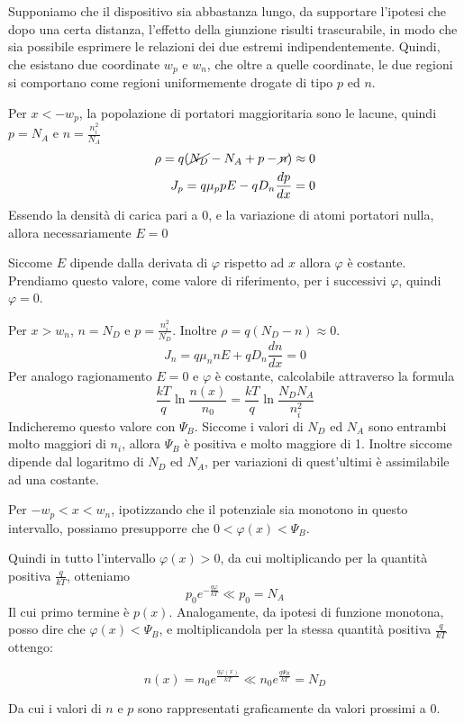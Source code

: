 \documentclass[../template]{subfiles}
\begin{document}
Supponiamo che il dispositivo sia abbastanza lungo, da supportare l'ipotesi che dopo una certa distanza, l'effetto della giunzione risulti trascurabile, in modo che sia possibile esprimere le relazioni dei due estremi indipendentemente.
Quindi, che esistano due coordinate $w_p$ e $w_n$, che oltre a quelle coordinate, le due regioni si comportano come regioni uniformemente drogate di tipo $p$ ed $n$.


\begin{tcolorbox}[title={Zona neutra p}]
    Per $x < -w_p$, la popolazione di portatori maggioritaria sono le lacune, quindi $p = N_A$ e $n = \frac{n_i^2}{N_A}$
    \begin{align*}
        \rho = q (\cancel{N_D} - N_A + p - \cancel{n}) \approx  0\\
        J_p = q \mu_p p E - q D_n \frac{dp}{dx} = 0
    \end{align*}
    Essendo la densità di carica pari a 0, e la variazione di atomi portatori nulla, allora necessariamente $E = 0$

    Siccome $E$ dipende dalla derivata di $\varphi$ rispetto ad $x$ allora $\varphi$ è costante. Prendiamo questo valore, come valore di riferimento, per i successivi $\varphi$, quindi $\varphi = 0$.
\end{tcolorbox}
\begin{tcolorbox}[title={Zona neutra n}]
    Per $x > w_n$, $n = N_D$ e $p = \frac{n_i^2}{N_D}$. Inoltre $\rho = q (N_D - n) \approx 0$.
    \[
        J_n = q \mu_n n E + q D_n \frac{dn}{dx} = 0
    \]
    Per analogo ragionamento $E = 0$ e $\varphi$ è costante, calcolabile attraverso la formula
    \[
        \frac{kT}{q} \ln \frac{n(x)}{n_0} = \frac{kT}{q} \ln \frac{N_D N_A}{n_i^2}
    \]
    Indicheremo questo valore con $\Psi_B$. Siccome i valori di $N_D$ ed $N_A$ sono entrambi molto maggiori di $n_i$, allora $\Psi_B$ è positiva e molto maggiore di 1.
    Inoltre siccome dipende dal logaritmo di $N_D$ ed $N_A$, per variazioni di quest'ultimi è assimilabile ad una costante.
\end{tcolorbox}
\begin{tcolorbox}[title={Regione svuotata}]
    Per $-w_p < x < w_n$, ipotizzando che il potenziale sia monotono in questo intervallo, possiamo presupporre che $0 < \varphi(x) < \Psi_B$.

    Quindi in tutto l'intervallo $\varphi(x) > 0$, da cui moltiplicando per la quantità positiva $\frac{q}{kT}$, otteniamo
    \[
        p_0 e^{-\frac{q\varphi}{kT}} \ll p_0 = N_A
    \]
    Il cui primo termine è $p(x)$.
    Analogamente, da ipotesi di funzione monotona, posso dire che $\varphi(x) < \Psi_B$, e moltiplicandola per la stessa quantità positiva $\frac{q}{kT}$ ottengo:

    \[
    n(x) = n_0 e^{\frac{q\varphi(x)}{kT}} \ll n_0 e^{\frac{q\Psi_B}{kT}} = N_D
    \]

    Da cui i valori di $n$ e $p$ sono rappresentati graficamente da valori prossimi a 0.
\end{tcolorbox}
\end{document}

